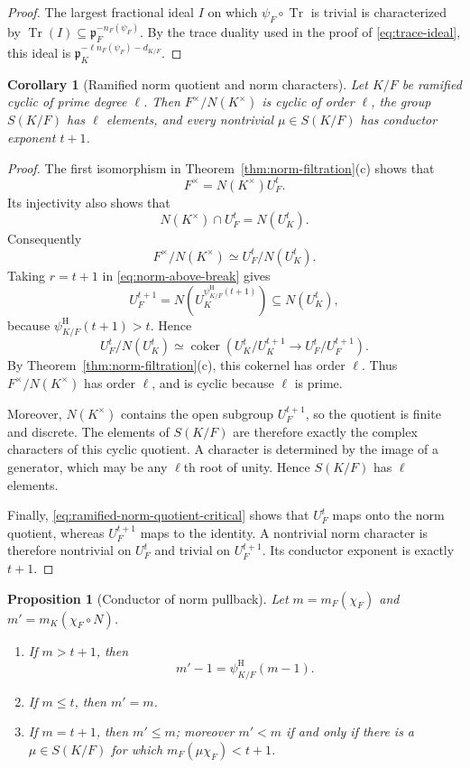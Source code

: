 \documentclass[11pt]{amsart}
\newtheorem{proposition}[theorem]{Proposition}
\newtheorem{corollary}[theorem]{Corollary}
\theoremstyle{definition}
\theoremstyle{remark}
\newcommand{\p}{\mathfrak p}
\newcommand{\Tr}{\operatorname{Tr}}
\newcommand{\HerbPsi}{\psi^{\mathrm H}}
\begin{document}
\begin{proof}
The largest fractional ideal $I$ on which $\psi_F\circ\Tr$ is trivial
is characterized by $\Tr(I)\subseteq\p_F^{-n_F(\psi_F)}$.  By the trace
duality used in the proof of \eqref{eq:trace-ideal}, this ideal is
$\p_K^{-\ell n_F(\psi_F)-d_{K/F}}$.
\end{proof}

\begin{corollary}[Ramified norm quotient and norm characters]
\label{cor:norm-characters}
Let $K/F$ be ramified cyclic of prime degree $\ell$.  Then
$F^\times/N(K^\times)$ is cyclic of order $\ell$, the group
$S(K/F)$ has $\ell$ elements, and every nontrivial
$\mu\in S(K/F)$ has conductor exponent $t+1$.
\end{corollary}

\begin{proof}
The first isomorphism in
Theorem~\ref{thm:norm-filtration}(c) shows that
\[
 F^\times=N(K^\times)U_F^t.
\]
Its injectivity also shows that
\[
 N(K^\times)\cap U_F^t=N(U_K^t).
\]
Consequently
\begin{equation}\label{eq:ramified-norm-quotient-critical}
 F^\times/N(K^\times)\simeq U_F^t/N(U_K^t).
\end{equation}
Taking $r=t+1$ in \eqref{eq:norm-above-break} gives
\[
 U_F^{t+1}=N(U_K^{\HerbPsi_{K/F}(t+1)})\subseteq N(U_K^t),
\]
because $\HerbPsi_{K/F}(t+1)>t$.  Hence
\[
 U_F^t/N(U_K^t)
 \simeq
 \operatorname{coker}\left(
 U_K^t/U_K^{t+1}\longrightarrow U_F^t/U_F^{t+1}
 \right).
\]
By Theorem~\ref{thm:norm-filtration}(c), this cokernel has order
$\ell$.  Thus $F^\times/N(K^\times)$ has order $\ell$, and is
cyclic because $\ell$ is prime.

Moreover, $N(K^\times)$ contains the open subgroup $U_F^{t+1}$, so
the quotient is finite and discrete.  The elements of $S(K/F)$ are
therefore exactly the complex characters of this cyclic quotient.  A
character is determined by the image of a generator, which may be any
$\ell$th root of unity.  Hence $S(K/F)$ has $\ell$ elements.

Finally, \eqref{eq:ramified-norm-quotient-critical} shows that
$U_F^t$ maps onto the norm quotient, whereas $U_F^{t+1}$ maps to the
identity.  A nontrivial norm character is therefore nontrivial on
$U_F^t$ and trivial on $U_F^{t+1}$.  Its conductor exponent is exactly
$t+1$.
\end{proof}

\begin{proposition}[Conductor of norm pullback]\label{prop:pullback-conductor}
Let $m=m_F(\chi_F)$ and $m'=m_K(\chi_F\circ N)$.
\begin{enumerate}[label=(\roman*)]
\item If $m>t+1$, then
\begin{equation}\label{eq:pullback-high}
 m'-1=\HerbPsi_{K/F}(m-1).
\end{equation}
\item If $m\leq t$, then $m'=m$.
\item If $m=t+1$, then $m'\leq m$; moreover $m'<m$ if and only if
there is a $\mu\in S(K/F)$ for which
$m_F(\mu\chi_F)<t+1$.
\end{enumerate}
\end{proposition}
\end{document}
